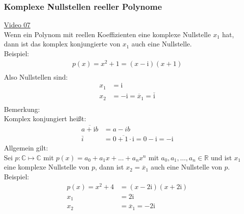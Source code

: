 \subsubsection{Komplexe Nullstellen reeller Polynome}
\href{https://youtu.be/uVsYwAYrcUs}{Video 07}\\
Wenn ein Polynom mit reellen Koeffizienten eine komplexe Nullstelle $ x_1 $ hat, dann ist das komplex konjungierte von $ x_1 $ auch eine Nullstelle.\\
Beispiel:\\
\begin{align*}
p(x)=x^2+1=(x-\mathrm{i})(x+1)\\
\end{align*}
Also Nullstellen sind:\\
\begin{align*}
 x_1&=\mathrm{i} \\
 x_2&=-\mathrm{i}=\overline{x}_1=\overline{\mathrm{i}} \\
\end{align*}
Bemerkung:\\
Komplex konjungiert heißt:\\
\begin{align*}
\overline{a+\mathrm{i}b}&=a-ib\\
\overline{i}&=\overline{0+1\cdot \mathrm{i}}=0-\mathrm{i}=-\mathrm{i}
\end{align*}
Allgemein gilt:\\
Sei $ p: \mathbb{C}\longmapsto  \mathbb{C} $ mit $ p(x)=a_0+a_1x+\ldots +a_nx^n $ mit $ a_0, a_1,\ldots, a_n\in \mathbb{R} $ und ist $ x_1 $ eine komplexe Nullstelle von $ p $, dann ist $x_2= \overline{x}_1 $ auch eine Nullstelle von $ p $.\vspace*{2mm}\\
Beispiel:\\
\begin{align*}
p(x)=x^2+4&=(x-2\mathrm{i})(x+2\mathrm{i})\\
x_1&=2\mathrm{i}\\
x_2&=\overline{x}_1=-2\mathrm{i}\\
\end{align*}
